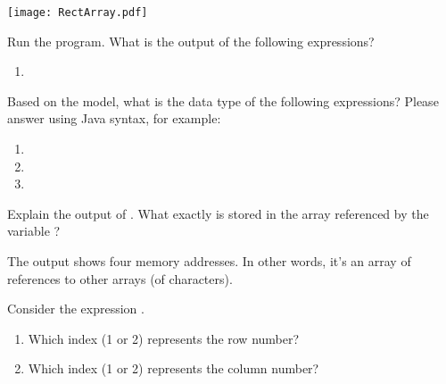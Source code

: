 

\vspace{-20em}
\hfill \texttt{[image: RectArray.pdf]}
\vspace{3em}




\Q Run the program. What is the output of the following expressions?

\begin{enumerate}
\item {}
\hfill \ans[27em]{\jans{[[C@4dc63996, [C@d716361, [C@6ff3c5b5, [C@3764951d]}}
\end{enumerate}


\Q Based on the model, what is the data type of the following expressions? Please answer using Java syntax, for example: 

\begin{multicols}{3}
\begin{enumerate}
\item {}

\item {}

\item {}
\end{enumerate}
\end{multicols}


\Q Explain the output of .
What exactly is stored in the array referenced by the variable ?

\begin{answer}[3em]
The output shows four memory addresses.
In other words, it's an array of references to other arrays (of characters).
\end{answer}


\Q Consider the expression .

\begin{enumerate}
\item Which index (1 or 2) represents the row number?    
\item Which index (1 or 2) represents the column number? 
\end{enumerate}


